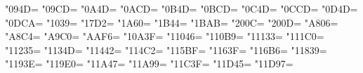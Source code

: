 \newXeTeXintercharclass\KclassVir
\newXeTeXintercharclass\KclassCM
\newXeTeXintercharclass\KclassNum
\newXeTeXintercharclass\KclassArabL
\newXeTeXintercharclass\KclassArabR
\newXeTeXintercharclass\KclassArabD
\newXeTeXintercharclass\KclassArabU

\XeTeXcharclass"094D=\KclassVir
\XeTeXcharclass"09CD=\KclassVir
\XeTeXcharclass"0A4D=\KclassVir
\XeTeXcharclass"0ACD=\KclassVir
\XeTeXcharclass"0B4D=\KclassVir
\XeTeXcharclass"0BCD=\KclassVir
\XeTeXcharclass"0C4D=\KclassVir
\XeTeXcharclass"0CCD=\KclassVir
\XeTeXcharclass"0D4D=\KclassVir
\XeTeXcharclass"0DCA=\KclassVir
\XeTeXcharclass"1039=\KclassVir
\XeTeXcharclass"17D2=\KclassVir
\XeTeXcharclass"1A60=\KclassVir
\XeTeXcharclass"1B44=\KclassVir
\XeTeXcharclass"1BAB=\KclassVir
\XeTeXcharclass"200C=\KclassVir
\XeTeXcharclass"200D=\KclassVir
\XeTeXcharclass"A806=\KclassVir
\XeTeXcharclass"A8C4=\KclassVir
\XeTeXcharclass"A9C0=\KclassVir
\XeTeXcharclass"AAF6=\KclassVir
\XeTeXcharclass"10A3F=\KclassVir
\XeTeXcharclass"11046=\KclassVir
\XeTeXcharclass"110B9=\KclassVir
\XeTeXcharclass"11133=\KclassVir
\XeTeXcharclass"111C0=\KclassVir
\XeTeXcharclass"11235=\KclassVir
\XeTeXcharclass"1134D=\KclassVir
\XeTeXcharclass"11442=\KclassVir
\XeTeXcharclass"114C2=\KclassVir
\XeTeXcharclass"115BF=\KclassVir
\XeTeXcharclass"1163F=\KclassVir
\XeTeXcharclass"116B6=\KclassVir
\XeTeXcharclass"11839=\KclassVir
\XeTeXcharclass"1193E=\KclassVir
\XeTeXcharclass"119E0=\KclassVir
\XeTeXcharclass"11A47=\KclassVir
\XeTeXcharclass"11A99=\KclassVir
\XeTeXcharclass"11C3F=\KclassVir
\XeTeXcharclass"11D45=\KclassVir
\XeTeXcharclass"11D97=\KclassVir


